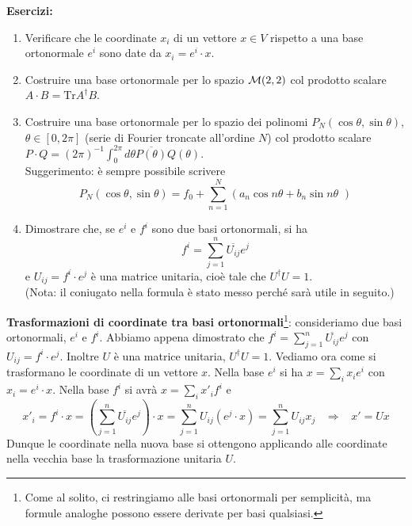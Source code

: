\documentclass[a4paper,10pt]{article}
\newcommand{\linea}{\vskip14pt \noindent}
\begin{document}
\linea
{\bf Esercizi:}
\begin{enumerate}
\item Verificare che le coordinate $x_i$ di un vettore $x \in V$ rispetto a una base ortonormale $e^i$ 
sono date da $x_i = e^i \cdot x$.
\item Costruire una base ortonormale per lo spazio ${\cal M}(2,2)$ col prodotto scalare 
$A\cdot B = \text{Tr} A^\dag B$.
\item Costruire una base ortonormale per lo spazio dei polinomi $P_N(\cos \theta,\sin \theta)$, 
$\theta \in [0,2\pi]$ (serie di Fourier troncate all'ordine $N$)
col prodotto scalare $P \cdot Q = (2\pi)^{-1} \int_0^{2\pi} d\theta \overline{P(\theta)} Q(\theta)$. \\
Suggerimento: \`e sempre possibile scrivere
\begin{equation} \nonumber
P_N(\cos\theta,\sin \theta)= f_0 + \sum_{n=1}^N (a_n \cos n\theta + b_n \sin n \theta\,\,)
\end{equation}
\item Dimostrare che, se $e^i$ e $f^i$ sono due basi ortonormali, si ha
\begin{equation} \nonumber
f^i = \sum_{j=1}^n \overline{U_{ij}} e^j
\end{equation}
e $U_{ij} = f^i \cdot e^j$ \`e una matrice unitaria, cio\`e tale che $U^\dag U = 1$. \\
(Nota: il coniugato nella formula \`e stato messo perch\'e sar\`a utile in seguito.)
\end{enumerate}

\linea
{\bf Trasformazioni di coordinate tra basi ortonormali}\footnote{Come al solito,
ci restringiamo alle basi ortonormali
per semplicit\`a, ma formule analoghe possono essere derivate per basi qualsiasi.}: consideriamo due basi
ortonormali, $e^i$ e $f^i$. Abbiamo appena dimostrato che
$f^i = \sum_{j=1}^n \overline{U_{ij}} e^j$ con 
$U_{ij} = f^i \cdot e^j$. Inoltre
$U$ \`e una matrice unitaria, $U^\dag U = 1$. Vediamo ora come
si trasformano le coordinate di un vettore $x$. Nella base $e^i$ si ha $x=\sum_i x_i e^i$ con
$x_i = e^i \cdot x$. Nella base $f^i$ si avr\`a $x= \sum_i x'_i f^i$ e
\begin{equation}
x'_i = f^i \cdot x = \left( \sum_{j=1}^n \overline{U_{ij}} e^j \right) \cdot x = 
\sum_{j=1}^n U_{ij} ( e^j \cdot x ) = \sum_{j=1}^n U_{ij} x_j 
\hspace{10pt} \Rightarrow \hspace{10pt} x' = U x
\end{equation}
Dunque le coordinate nella nuova base si ottengono applicando alle coordinate nella vecchia base la 
trasformazione unitaria $U$.
\end{document}
